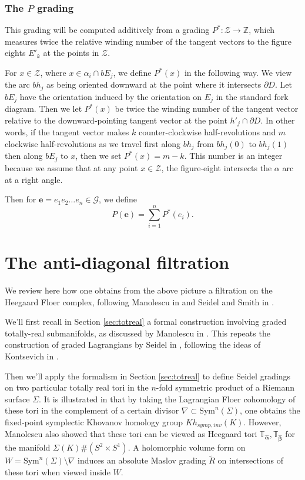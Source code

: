 \documentclass[11pt]{article}
\theoremstyle{plain} \newtheorem{thm}{Theorem}[subsection]
\theoremstyle{plain} \newtheorem{cor}[thm]{Corollary}
\theoremstyle{plain} \newtheorem{prop}[thm]{Proposition}
\theoremstyle{plain} \newtheorem{conj}[thm]{Conjecture}
\theoremstyle{plain} \newtheorem{lem}[thm]{Lemma}
\theoremstyle{definition} \newtheorem{df}[thm]{Definition}
\theoremstyle{remark} \newtheorem{rmk}[thm]{Remark}
\theoremstyle{remark} \newtheorem{obs}[thm]{Observation}
\newcommand{\DBCs}[1]{\Sigma(#1)\#(S^{2}\times S^{1})}
\newcommand{\Zcal}{\mathcal{Z}}
\newcommand{\G}{\mathcal{G}}
\newcommand{\tld}[1]{\widetilde{#1}}
\newcommand{\ba}{\boldsymbol{\alpha}}
\newcommand{\bb}{\boldsymbol{\beta}}
\newcommand{\bah}{\widehat{\ba}}
\newcommand{\bbh}{\widehat{\bb}}
\newcommand{\Tah}{\mathbb{T}_{\bah}}
\newcommand{\Tbh}{\mathbb{T}_{\bbh}}
\newcommand{\be}{\mathbf{e}}
\newcommand{\Kst}[1]{Kh_{symp,inv}(#1)}
\newcommand{\AD}{\nabla}
\begin{document}
\subsubsection{The $P$ grading}\label{sec:Pdef}
 
This grading will be computed additively from a grading $ P^{*} : \Zcal \rightarrow \mathbb{Z}$, which measures twice the relative winding number of the tangent vectors to the figure eights $E'_{k}$ at the points in $\Zcal$.
 
For $x \in \Zcal$, where $x \in \alpha_{i} \cap bE_{j}$, we define $ P^{*}(x)$ in the following way. We view the arc $bh_{j}$ as being oriented downward at the point where it intersects $\partial D$.  Let $bE_{j}$ have the orientation induced by the orientation on $E_{j}$ in the standard fork diagram.  Then we let $ P^{*}(x)$ be twice the winding number of the tangent vector relative to the downward-pointing tangent vector at the point $h'_{j} \cap \partial D$.  In other words, if the tangent vector makes $k$ counter-clockwise half-revolutions and $m$ clockwise half-revolutions as we travel first along $bh_{j}$ from $bh_{j} (0)$ to $bh_{j} (1)$ then along $bE_{j}$ to $x$, then we set $ P^{*}(x) = m-k$.  This number is an integer because we assume that at any point $x \in \Zcal$, the figure-eight intersects the $\alpha$ arc at a right angle.

Then for $\be = e_{1} e_{2} \ldots e_{n} \in \G$, we define
\begin{equation*}
 P(\be) = \sum_{i = 1}^{n}   P^{*}(e_{i}).
\end{equation*}

\section{The anti-diagonal filtration}\label{sec:AD}

We review here how one obtains from the above picture a filtration on the Heegaard Floer complex, following Manolescu in \cite{cm:R} and Seidel and Smith in \cite{ss:R2}.

We'll first recall in Section \ref{sec:totreal} a formal construction involving graded totally-real submanifolds, as discussed by Manolescu in \cite{cm:R}.  This repeats the construction of graded Lagrangians by Seidel in  \cite{s:GL}, following the ideas of Kontsevich in \cite{kont:GL}.

Then we'll apply the formalism in Section \ref{sec:totreal} to define Seidel gradings on two particular totally real tori in the $n$-fold symmetric product of a Riemann surface $\Sigma$.  It is illustrated in \cite{cm:R} that by taking the Lagrangian Floer cohomology of these tori in the complement of a certain divisor $\AD \subset \text{Sym}^{n}(\Sigma)$, one obtains the fixed-point symplectic Khovanov homology group $\Kst{K}$.  However, Manolescu also showed that these tori can be viewed as Heegaard tori $\Tah, \Tbh$ for the manifold $\DBCs{K}$.  A holomorphic volume form on $W = \text{Sym}^{n}(\Sigma) \setminus \AD$ induces an absolute Maslov grading $\tld{R}$ on intersections of these tori when viewed inside $W$.
\end{document}
